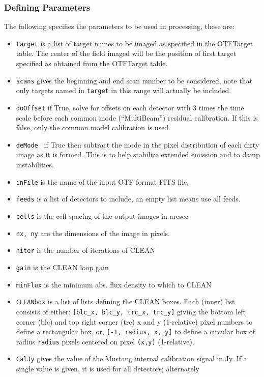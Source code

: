\documentclass[11pt]{report}
\begin{document}
\subsubsection{Defining Parameters\label{defparm}}
The following specifies the parameters to be used in processing, these
are:
\begin{itemize}
\item {\tt target} is a list of target names to be imaged as specified in
the OTFTarget table.
The center of the field imaged will be the position of first target specified 
as obtained from the OTFTarget table.
\item {\tt scans} gives the beginning and end scan number to be considered,
note that only targets named in {\tt target} in this range will
actually be included.
\item {\tt doOffset} if True, solve for offsets on each detector with
3 times the time scale before each common mode (``MultiBeam'')
residual calibration.
If this is false, only the common model calibration is used.
\item {\tt deMode } if True then subtract the mode in the pixel
distribution of each dirty image as it is formed.
This is to help stabilize extended emission and to damp instabilities.
\item {\tt inFile} is the name of the input OTF format FITS file.
\item {\tt feeds} is a list of detectors to include, an empty list
means use all feeds.
\item {\tt cells} is the cell spacing of the output images in arcsec
\item {\tt nx, ny} are the dimensions of the image in pixels.
\item {\tt niter} is the number of iterations of CLEAN
\item {\tt gain} is the CLEAN loop gain
\item {\tt minFlux} is the minimum abs. flux density to which to CLEAN
\item {\tt CLEANbox} is a list of lists defining the CLEAN boxes.
Each (inner) list consists of either:
{\tt [blc\_x, blc\_y, trc\_x, trc\_y]} giving the bottom left corner (blc)
and top right corner (trc) x and y (1-relative) pixel numbers to
define a rectangular box, or, {\tt [-1, radius, x, y]} to define a
circular box of radius {\tt radius} pixels centered on pixel {\tt (x,y)} (1-relative).
\item {\tt CalJy} gives the value of the Mustang internal calibration signal
in Jy.
If a single value is given, it is used for all detectors; alternately

\end{itemize}
\end{document}
